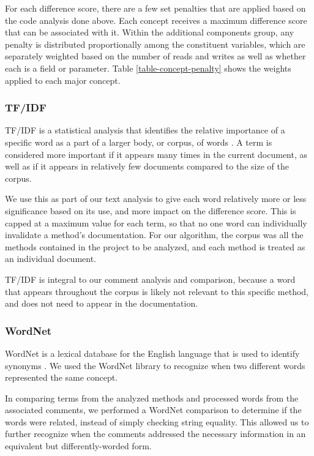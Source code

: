 \documentclass[preprint]{sigplanconf}
\begin{document}
For each difference score, there are a few set penalties that are applied based on the code analysis done above. Each concept receives a maximum difference score that can be associated with it. Within the additional components group, any penalty is distributed proportionally among the constituent variables, which are separately weighted based on the number of reads and writes as well as whether each is a field or parameter. Table \ref{table-concept-penalty} shows the weights applied to each major concept.

\subsubsection{TF/IDF}
TF/IDF is a statistical analysis that identifies the relative importance of a specific word as a part of a larger body, or corpus, of words \cite{stanford}. A term is considered more important if it appears many times in the current document, as well as if it appears in relatively few documents compared to the size of the corpus.

We use this as part of our text analysis to give each word relatively more or less significance based on its use, and more impact on the difference score. This is capped at a maximum value for each term, so that no one word can individually invalidate a method's documentation. For our algorithm, the corpus was all the methods contained in the project to be analyzed, and each method is treated as an individual document.

TF/IDF is integral to our comment analysis and comparison, because a word that appears throughout the corpus is likely not relevant to this specific method, and does not need to appear in the documentation.

\subsubsection{WordNet}
WordNet is a lexical database for the English language that is used to identify synonyms \cite{wordnet}. We used the WordNet library to recognize when two different words represented the same concept.

In comparing terms from the analyzed methods and processed words from the associated comments, we performed a WordNet comparison to determine if the words were related, instead of simply checking string equality. This allowed us to further recognize when the comments addressed the necessary information in an equivalent but differently-worded form.
\end{document}
